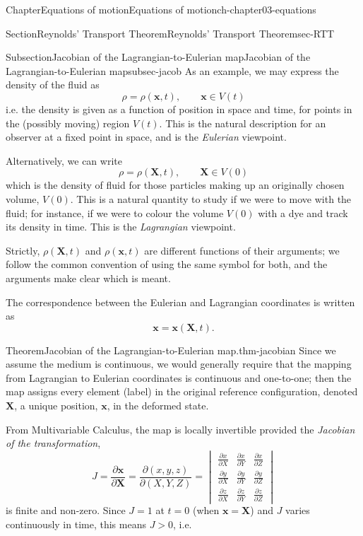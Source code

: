 \documentclass[oneside,10pt,]{book}
\numberwithin{equation}{section}
\newcommand{\pd}[2]{\frac{\partial#1}{\partial#2}}
\newcommand{\bx}{\boldsymbol{x}}
\newcommand{\bX}{\boldsymbol{X}}
\begin{document}
\begin{chapterptx}{Chapter}{Equations of motion}{}{Equations of motion}{}{}{ch-chapter03-equations}
\begin{sectionptx}{Section}{Reynolds' Transport Theorem}{}{Reynolds' Transport Theorem}{}{}{sec-RTT}
\begin{subsectionptx}{Subsection}{Jacobian of the Lagrangian-to-Eulerian map}{}{Jacobian of the Lagrangian-to-Eulerian map}{}{}{subsec-jacob}
As an example, we may express the density of the fluid as%
\begin{equation*}
\rho = \rho(\bx, t), \qquad \textrm{$\bx \in V(t)$}
\end{equation*}
i.e. the density is given as a function of position in space and time, for points in the (possibly moving) region \(V(t)\). This is the natural description for an observer at a fixed point in space, and is the \emph{Eulerian} viewpoint.%
\par
Alternatively, we can write%
\begin{equation*}
\rho = \rho(\bX, t), \qquad \textrm{$\bX \in V(0)$}
\end{equation*}
which is the density of fluid for those particles making up an originally chosen volume, \(V(0)\). This is a natural quantity to study if we were to move with the fluid; for instance, if we were to colour the volume \(V(0)\) with a dye and track its density in time. This is the \emph{Lagrangian} viewpoint.%
\par
Strictly, \(\rho(\bX, t)\) and \(\rho(\bx, t)\) are different functions of their arguments; we follow the common convention of using the same symbol for both, and the arguments make clear which is meant.%
\par
The correspondence between the Eulerian and Lagrangian coordinates is written as%
\begin{equation*}
\bx = \bx(\bX, t).
\end{equation*}
%
\begin{theorem}{Theorem}{Jacobian of the Lagrangian-to-Eulerian map.}{}{thm-jacobian}%
Since we assume the medium is continuous, we would generally require that the mapping from Lagrangian to Eulerian coordinates is continuous and one-to-one; then the map assigns every element (label) in the original reference configuration, denoted \(\bX\), a unique position, \(\bx\), in the deformed state.%
\par
From Multivariable Calculus, the map is locally invertible provided the \emph{Jacobian of the transformation},%
\begin{equation*}
J = \pd{\bx}{\bX} = \pd{(x, y, z)}{(X, Y, Z)} =
\begin{vmatrix}
\pd{x}{X} & \pd{x}{Y} & \pd{x}{Z} \\
\pd{y}{X} & \pd{y}{Y} & \pd{y}{Z} \\
\pd{z}{X} & \pd{z}{Y} & \pd{z}{Z}
\end{vmatrix}
\end{equation*}
is finite and non-zero. Since \(J = 1\) at \(t = 0\) (when \(\bx = \bX\)) and \(J\) varies continuously in time, this means \(J > 0\), i.e.%

\end{theorem}
\end{subsectionptx}
\end{sectionptx}
\end{chapterptx}
\end{document}
